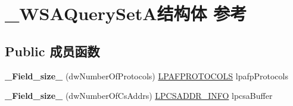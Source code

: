 \hypertarget{struct___w_s_a_query_set_a}{}\section{\+\_\+\+W\+S\+A\+Query\+Set\+A结构体 参考}
\label{struct___w_s_a_query_set_a}
\subsection*{Public 成员函数}
\begin{DoxyCompactItemize}
\item 
\mbox{\label{struct___w_s_a_query_set_a_a771f665c85564efcce330669cdbdcca6}} 
{\bfseries \+\_\+\+Field\+\_\+size\+\_\+} (dw\+Number\+Of\+Protocols) \hyperlink{struct___a_f_p_r_o_t_o_c_o_l_s}{L\+P\+A\+F\+P\+R\+O\+T\+O\+C\+O\+LS} lpafp\+Protocols
\item 
\mbox{\label{struct___w_s_a_query_set_a_a182acd7c01ba5d47c7fd9392956bb896}} 
{\bfseries \+\_\+\+Field\+\_\+size\+\_\+} (dw\+Number\+Of\+Cs\+Addrs) \hyperlink{struct___c_s_a_d_d_r___i_n_f_o}{L\+P\+C\+S\+A\+D\+D\+R\+\_\+\+I\+N\+FO} lpcsa\+Buffer
\end{DoxyCompactItemize}
